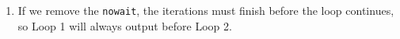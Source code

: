 \begin{enumerate}[label=\textbf{\Alph*)}]
\begin{enumerate}[label=\arabic*.]
        
        \item If we remove the \texttt{nowait}, the iterations must finish before the loop continues, so Loop 1 will always output before Loop 2.

\end{enumerate}
\end{enumerate}
